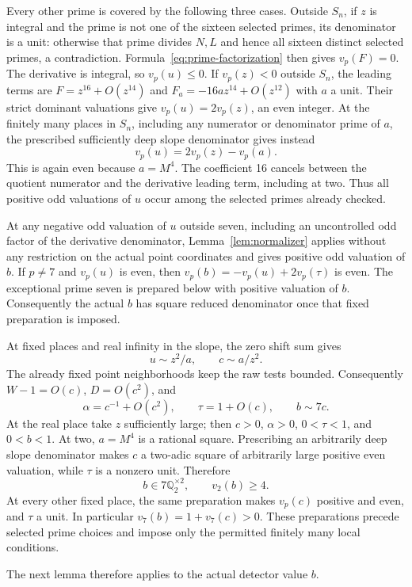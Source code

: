 \documentclass[11pt,a4paper]{article}
\newcommand{\Q}{\mathbb Q}\newcommand{\Z}{\mathbb Z}
\begin{document}
Every other prime is covered by the following three cases. Outside
$S_n$, if $z$ is integral and the prime is not one of the sixteen selected
primes, its denominator is a unit: otherwise that prime divides $N,L$
and hence all sixteen distinct selected primes, a contradiction.
Formula~\eqref{eq:prime-factorization} then gives $v_p(F)=0$.
The derivative is integral, so $v_p(u)\le0$. If $v_p(z)<0$ outside
$S_n$, the leading terms are $F=z^{16}+O(z^{14})$ and
$F_a=-16az^{14}+O(z^{12})$ with $a$ a unit. Their strict dominant
valuations give $v_p(u)=2v_p(z)$, an even integer. At the finitely many
places in $S_n$, including any numerator or denominator prime of $a$,
the prescribed sufficiently deep slope denominator gives instead
\[
                      v_p(u)=2v_p(z)-v_p(a).
\]
This is again even because $a=M^4$. The coefficient 16 cancels between
the quotient numerator and the derivative leading term, including at
two. Thus all positive odd valuations of $u$ occur among the selected
primes already checked.

At any negative odd valuation of $u$ outside seven, including an
uncontrolled odd factor of the derivative denominator,
Lemma~\ref{lem:normalizer} applies without any restriction on the actual
point coordinates and gives positive odd valuation of $b$.
If $p\ne7$ and $v_p(u)$ is even, then $v_p(b)=-v_p(u)+2v_p(\tau)$
is even. The exceptional prime seven is prepared below with positive
valuation of $b$. Consequently the actual $b$ has square reduced
denominator once that fixed preparation is imposed.

At fixed places and real infinity in the slope, the zero shift sum gives
\[
 u\sim z^2/a,\qquad c\sim a/z^2.
\]
The already fixed point neighborhoods keep the raw tests bounded.
Consequently $W-1=O(c)$, $D=O(c^2)$, and
\[
 \alpha=c^{-1}+O(c^2),\qquad \tau=1+O(c),\qquad b\sim7c.
\]
At the real place take $z$ sufficiently large; then $c>0$, $\alpha>0$,
$0<\tau<1$, and $0<b<1$. At two, $a=M^4$ is a rational square.
Prescribing an arbitrarily deep slope denominator makes $c$ a two-adic
square of arbitrarily large positive even valuation, while $\tau$ is
a nonzero unit. Therefore
\[
 b\in7\Q_2^{\times2},\qquad v_2(b)\ge4.
\]
At every other fixed place, the same preparation makes $v_p(c)$ positive
and even, and $\tau$ a unit. In particular $v_7(b)=1+v_7(c)>0$.
These preparations precede selected prime choices and impose only the
permitted finitely many local conditions.

The next lemma therefore applies to the actual detector value $b$.
\end{document}
